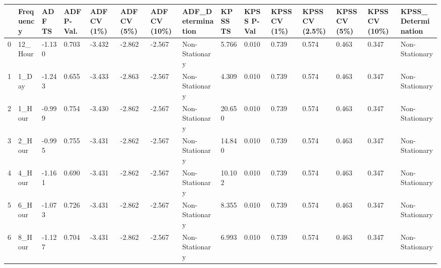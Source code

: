 \begin{tabular}{lllllllllllllll}
\toprule
 & Frequency & ADF TS & ADF P-Val. & ADF CV (1\%) & ADF CV (5\%) & ADF CV (10\%) & ADF_Determination & KPSS TS & KPSS P-Val & KPSS CV (1\%) & KPSS CV (2.5\%) & KPSS CV (5\%) & KPSS CV (10\%) & KPSS_Determination \\
\midrule
0 & 12_Hour & -1.130 & 0.703 & -3.432 & -2.862 & -2.567 & Non-Stationary & 5.766 & 0.010 & 0.739 & 0.574 & 0.463 & 0.347 & Non-Stationary \\
1 & 1_Day & -1.243 & 0.655 & -3.433 & -2.863 & -2.567 & Non-Stationary & 4.309 & 0.010 & 0.739 & 0.574 & 0.463 & 0.347 & Non-Stationary \\
2 & 1_Hour & -0.999 & 0.754 & -3.430 & -2.862 & -2.567 & Non-Stationary & 20.650 & 0.010 & 0.739 & 0.574 & 0.463 & 0.347 & Non-Stationary \\
3 & 2_Hour & -0.995 & 0.755 & -3.431 & -2.862 & -2.567 & Non-Stationary & 14.840 & 0.010 & 0.739 & 0.574 & 0.463 & 0.347 & Non-Stationary \\
4 & 4_Hour & -1.161 & 0.690 & -3.431 & -2.862 & -2.567 & Non-Stationary & 10.102 & 0.010 & 0.739 & 0.574 & 0.463 & 0.347 & Non-Stationary \\
5 & 6_Hour & -1.073 & 0.726 & -3.431 & -2.862 & -2.567 & Non-Stationary & 8.355 & 0.010 & 0.739 & 0.574 & 0.463 & 0.347 & Non-Stationary \\
6 & 8_Hour & -1.127 & 0.704 & -3.431 & -2.862 & -2.567 & Non-Stationary & 6.993 & 0.010 & 0.739 & 0.574 & 0.463 & 0.347 & Non-Stationary \\
\bottomrule
\end{tabular}
